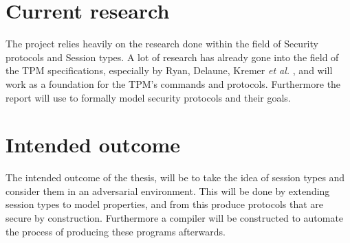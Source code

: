 
\section{Current research}
The project relies heavily on the research done within the field of Security protocols and Session types. A lot of research has already gone into the field of the TPM specifications, especially by Ryan, Delaune, Kremer \textit{et al.} \autocite{DBLP:conf/ifip1-7/DelauneKRS10}, and will work as a foundation for the TPM's commands and protocols. Furthermore the report will use \citeauthor{DBLP:journals/ftpl/CortierK14,} to formally model security protocols and their goals.

\section{Intended outcome}
The intended outcome of the thesis, will be to take the idea of session types and consider them in an adversarial environment. This will be done by extending session types to model properties, and
from this produce protocols that are secure by construction. Furthermore a compiler will be constructed to automate the process of producing these programs afterwards. 